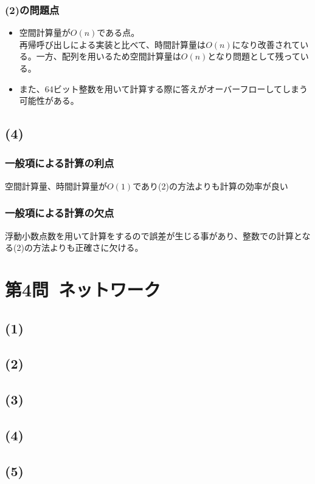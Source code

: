\documentclass[a4paper,12pt,xelatex,ja=standard]{bxjsarticle}
\begin{document}
    \subsubsection*{(2)の問題点}
    \begin{itemize}
      \item 空間計算量が\(O(n)\)である点。\\
        再帰呼び出しによる実装と比べて、時間計算量は\(O(n)\)になり改善されている。一方、配列を用いるため空間計算量は\(O(n)\)となり問題として残っている。\\
      \item また、64ビット整数を用いて計算する際に答えがオーバーフローしてしまう可能性がある。
    \end{itemize}
  \subsection*{(4)}
    \subsubsection*{一般項による計算の利点}
    空間計算量、時間計算量が\(O(1)\)であり(2)の方法よりも計算の効率が良い
    \subsubsection*{一般項による計算の欠点}
    浮動小数点数を用いて計算をするので誤差が生じる事があり、整数での計算となる(2)の方法よりも正確さに欠ける。

\section*{第4問\ ネットワーク}
  \subsection*{(1)}
  \subsection*{(2)}
  \subsection*{(3)}
  \subsection*{(4)}
  \subsection*{(5)}
\end{document}

